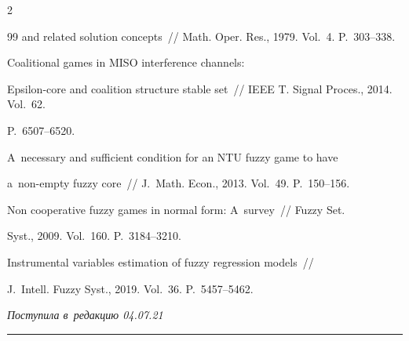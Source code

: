 \begin{multicols}{2}
{{\begin{thebibliography}{99}
and related solution concepts~// Math.  Oper. Res., 1979. Vol.~4. P.~303--338.


       Coalitional games in MISO interference channels: 

Epsilon-core and coalition structure stable set~// IEEE T. Signal Proces., 2014. Vol.~62. 

P.~6507--6520.


       A~necessary and sufficient condition for an NTU fuzzy game to have 

a~non-empty fuzzy core~// J.~Math. Econ., 2013. Vol.~49. P.~150--156.


       Non cooperative fuzzy games in normal form: A~survey~// Fuzzy Set. 

Syst., 2009. Vol.~160. P.~3184--3210.


       Instrumental variables estimation of fuzzy regression models~// 

J.~Intell. Fuzzy Syst., 2019. Vol.~36. P.~5457--5462.



\end{thebibliography}



 }

 }



\end{multicols}



\vspace*{-9pt}



\hfill{\small\textit{Поступила в~редакцию 04.07.21}}



\vspace*{6pt}












\hrule



